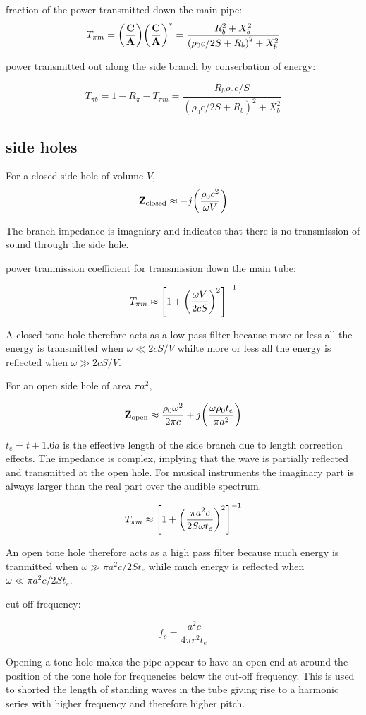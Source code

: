 \documentclass[10pt, a4paper, twocolumn]{article}
\begin{document}
fraction of the power transmitted down the main pipe:
\[T_{\pi m} = \qty(\frac{\vb C}{\vb A})
\qty(\frac{\vb C}{\vb A})^*
=\frac{R_b^2 + X_b^2}
{\qty(\rho _0c/2S + R_b)^2 +X_b^2}\]

power transmitted out along the side branch by conserbation of energy:

\[T_{\pi b} = 1-R_\pi-T_{\pi m}
=\frac{R_b\rho _0c/S}{(\rho _0c/2S+R_b)^2+X_b^2}\]

\subsection{side holes}

For a closed side hole of volume $V$,
\[\vb Z_\mathrm{closed} \approx -j\qty(\frac{\rho _0c^2}
{\omega V})\]

The branch impedance is imagniary and indicates that there is no transmission of sound through the side hole.

power tranmission coefficient for transmission down the main tube:

\[T_{\pi m} \approx
\left[1+\qty(\frac{\omega V}{2cS})^2\right]^{-1} \]

A closed tone hole therefore acts as a low pass filter because more or less all the energy is transmitted when $\omega \ll 2cS/V$ whilte more or less all the energy is reflected when $\omega \gg 2cS/V$.

For an open side hole of area $\pi a^2$,

\[\vb Z_\mathrm{open} \approx
\frac{\rho _0\omega ^2}{2\pi c}
+j\qty(\frac{\omega \rho _0t_e}{\pi a^2})\]

$t_e = t+1.6a$ is the effective length of the side branch due to length correction effects. The impedance is complex, implying that the wave is partially reflected and transmitted at the open hole. For musical instruments the imaginary part is always larger than the real part over the audible spectrum.

\[T_{\pi m} \approx
\left[1+\qty(\frac{\pi a^2c}
{2S\omega t_e})^2\right]^{-1} \]

An open tone hole therefore acts as a high pass filter because much energy is tranmitted when $\omega \gg \pi a^2c/2St_e$ while much energy is reflected when $\omega \ll \pi a^2c/2St_e$.

cut-off frequency:

\[f_c=\frac{a^2c}{4\pi r^2t_e}\]

Opening a tone hole makes the pipe appear to have an open end at around the position of the tone hole for frequencies below the cut-off frequency. This is used to shorted the length of standing waves in the tube giving rise to a harmonic series with higher frequency and therefore higher pitch.
\end{document}
